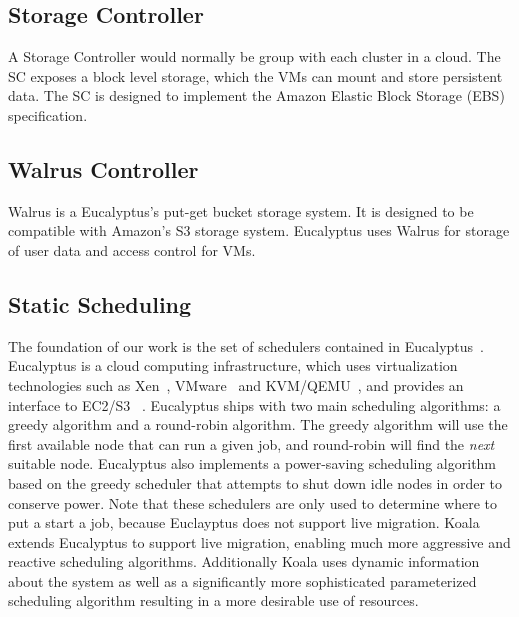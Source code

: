 \subsection{Storage Controller}
A Storage Controller would normally be group with each cluster in a cloud.  The SC exposes a block level storage, which the VMs can mount and store persistent data.  The SC is designed to implement the Amazon Elastic Block Storage (EBS) specification.

\subsection{Walrus Controller}
Walrus is a Eucalyptus's put-get bucket storage system.  It is designed to be compatible with Amazon's S3 storage system.  Eucalyptus uses Walrus for storage of user data and access control for VMs.

\subsection{Static Scheduling}
The foundation of our work is the set of schedulers contained in
Eucalyptus~\cite{Eucalyptus}.  Eucalyptus is a cloud computing infrastructure,
which uses virtualization technologies such as Xen~\cite{Xen},
VMware~\cite{VMware} and KVM/QEMU~\cite{QEMU}, and provides an interface to
EC2/S3 ~\cite{AWS}.   Eucalyptus ships with two main scheduling algorithms: a
greedy algorithm and a round-robin algorithm.  The greedy algorithm will use the
first available node that can run a given job, and round-robin will find the
\emph{next} suitable node.  Eucalyptus also implements a power-saving scheduling
algorithm based on the greedy scheduler that attempts to shut down idle nodes in
order to conserve power.  Note that these schedulers are only used to determine
where to put a start a job, because Euclayptus does not support live migration.
Koala extends Eucalyptus to support live migration, enabling much more
aggressive and reactive scheduling algorithms.  Additionally Koala uses dynamic
information about the system as well as a significantly more sophisticated
parameterized scheduling algorithm resulting in a more desirable use of
resources.


